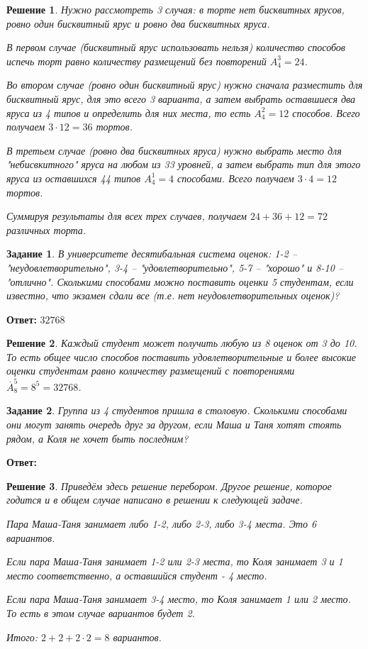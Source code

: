 \documentclass[a4paper,oneside]{memoir}
\newtheorem{task}{Задание}
\newtheorem{solution}{Решение}
\begin{document}
\begin{solution}
Нужно рассмотреть 3 случая: в торте нет бисквитных ярусов, ровно один бисквитный ярус и ровно два бисквитных яруса.

В первом случае (бисквитный ярус использовать нельзя) количество способов испечь торт равно количеству размещений без повторений $ A_4^3 = 24 $.

Во втором случае (ровно один бисквитный ярус) нужно сначала разместить для бисквитный ярус, для это всего 3 варианта, а затем выбрать оставшиеся два яруса из 4 типов и определить для них места, то есть $ A_4^2 = 12 $ способов. Всего получаем $ 3\cdot 12=36 $ тортов.

В третьем случае (ровно два бисквитных яруса) нужно выбрать место для "небисвкитного" яруса на любом из 33 уровней, а затем выбрать тип для этого яруса из оставшихся 44 типов $ A_4^1 = 4 $ способами. Всего получаем $ 3\cdot 4 = 12 $ тортов.

Суммируя результаты для всех трех случаев, получаем $ 24+36+12 = 72 $ различных торта.
\end{solution}

\hrulefill

\begin{task}
В университете десятибальная система оценок: 1-2 -- "неудовлетворительно", 3-4 -- "удовлетворительно", 5-7 -- "хорошо" и 8-10 -- "отлично". Сколькими способами можно поставить оценки 5 студентам, если известно, что экзамен сдали все (т.е. нет неудовлетворительных оценок)?
\end{task}

\textbf{Ответ:} $ 32768 $

\begin{solution}
 Каждый студент может получить любую из 8 оценок от 3 до 10. То есть общее число способов поставить удовлетворительные и более высокие оценки студентам равно количеству размещений с повторениями $ \overline{A}_{8}^5 = 8^5 = 32768 $.
\end{solution}

\hrulefill

\begin{task}
	Группа из 4 студентов пришла в столовую. Сколькими способами они могут занять очередь друг за другом, если Маша и Таня хотят стоять рядом, а Коля не хочет быть последним?
\end{task}

\textbf{Ответ:} $  $

\begin{solution}
	Приведём здесь решение перебором. Другое решение, которое годится и в общем случае написано в решении к следующей задаче.
	
	Пара Маша-Таня занимает либо 1-2, либо 2-3, либо 3-4 места. Это 6 вариантов.
	
	Если пара Маша-Таня занимает 1-2 или 2-3 места, то Коля занимает 3 и 1 место соответственно, а оставшийся студент - 4 место.
	
	Если пара Маша-Таня занимает 3-4 место, то Коля занимает 1 или 2 место. То есть в этом случае вариантов будет 2.
	
	Итого: $ 2+2+2 \cdot 2=8 $ вариантов.
\end{solution}
\end{document}
